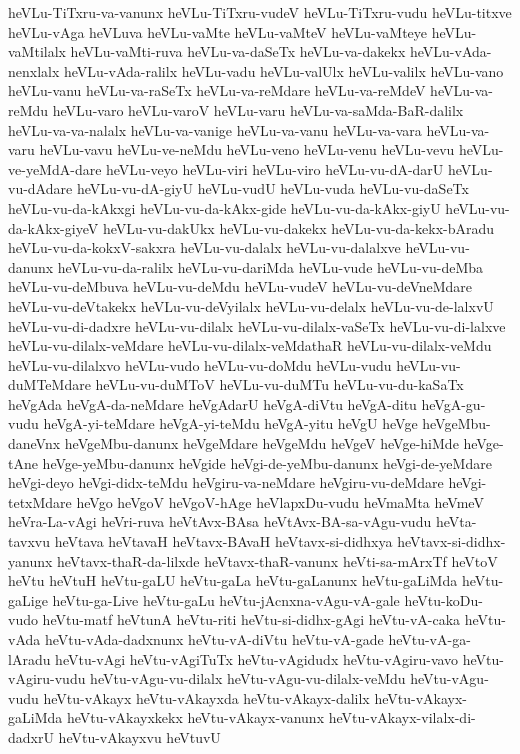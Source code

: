 {heVLu-TiTxru-va-vanunx
heVLu-TiTxru-vudeV
heVLu-TiTxru-vudu
heVLu-titxve
heVLu-vAga
heVLuva
heVLu-vaMte
heVLu-vaMteV
heVLu-vaMteye
heVLu-vaMtilalx
heVLu-vaMti-ruva
heVLu-va-daSeTx
heVLu-va-dakekx
heVLu-vAda-nenxlalx
heVLu-vAda-ralilx
heVLu-vadu
heVLu-valUlx
heVLu-valilx
heVLu-vano
heVLu-vanu
heVLu-va-raSeTx
heVLu-va-reMdare
heVLu-va-reMdeV
heVLu-va-reMdu
heVLu-varo
heVLu-varoV
heVLu-varu
heVLu-va-saMda-BaR-dalilx
heVLu-va-va-nalalx
heVLu-va-vanige
heVLu-va-vanu
heVLu-va-vara
heVLu-va-varu
heVLu-vavu
heVLu-ve-neMdu
heVLu-veno
heVLu-venu
heVLu-vevu
heVLu-ve-yeMdA-dare
heVLu-veyo
heVLu-viri
heVLu-viro
heVLu-vu-dA-darU
heVLu-vu-dAdare
heVLu-vu-dA-giyU
heVLu-vudU
heVLu-vuda
heVLu-vu-daSeTx
heVLu-vu-da-kAkxgi
heVLu-vu-da-kAkx-gide
heVLu-vu-da-kAkx-giyU
heVLu-vu-da-kAkx-giyeV
heVLu-vu-dakUkx
heVLu-vu-dakekx
heVLu-vu-da-kekx-bAradu
heVLu-vu-da-kokxV-sakxra
heVLu-vu-dalalx
heVLu-vu-dalalxve
heVLu-vu-danunx
heVLu-vu-da-ralilx
heVLu-vu-dariMda
heVLu-vude
heVLu-vu-deMba
heVLu-vu-deMbuva
heVLu-vu-deMdu
heVLu-vudeV
heVLu-vu-deVneMdare
heVLu-vu-deVtakekx
heVLu-vu-deVyilalx
heVLu-vu-delalx
heVLu-vu-de-lalxvU
heVLu-vu-di-dadxre
heVLu-vu-dilalx
heVLu-vu-dilalx-vaSeTx
heVLu-vu-di-lalxve
heVLu-vu-dilalx-veMdare
heVLu-vu-dilalx-veMdathaR
heVLu-vu-dilalx-veMdu
heVLu-vu-dilalxvo
heVLu-vudo
heVLu-vu-doMdu
heVLu-vudu
heVLu-vu-duMTeMdare
heVLu-vu-duMToV
heVLu-vu-duMTu
heVLu-vu-du-kaSaTx
heVgAda
heVgA-da-neMdare
heVgAdarU
heVgA-diVtu
heVgA-ditu
heVgA-gu-vudu
heVgA-yi-teMdare
heVgA-yi-teMdu
heVgA-yitu
heVgU
heVge
heVgeMbu-daneVnx
heVgeMbu-danunx
heVgeMdare
heVgeMdu
heVgeV
heVge-hiMde
heVge-tAne
heVge-yeMbu-danunx
heVgide
heVgi-de-yeMbu-danunx
heVgi-de-yeMdare
heVgi-deyo
heVgi-didx-teMdu
heVgiru-va-neMdare
heVgiru-vu-deMdare
heVgi-tetxMdare
heVgo
heVgoV
heVgoV-hAge
heVlapxDu-vudu
heVmaMta
heVmeV
heVra-La-vAgi
heVri-ruva
heVtAvx-BAsa
heVtAvx-BA-sa-vAgu-vudu
heVta-tavxvu
heVtava
heVtavaH
heVtavx-BAvaH
heVtavx-si-didhxya
heVtavx-si-didhx-yanunx
heVtavx-thaR-da-lilxde
heVtavx-thaR-vanunx
heVti-sa-mArxTf
heVtoV
heVtu
heVtuH
heVtu-gaLU
heVtu-gaLa
heVtu-gaLanunx
heVtu-gaLiMda
heVtu-gaLige
heVtu-ga-Live
heVtu-gaLu
heVtu-jAcnxna-vAgu-vA-gale
heVtu-koDu-vudo
heVtu-matf
heVtunA
heVtu-riti
heVtu-si-didhx-gAgi
heVtu-vA-caka
heVtu-vAda
heVtu-vAda-dadxnunx
heVtu-vA-diVtu
heVtu-vA-gade
heVtu-vA-ga-lAradu
heVtu-vAgi
heVtu-vAgiTuTx
heVtu-vAgidudx
heVtu-vAgiru-vavo
heVtu-vAgiru-vudu
heVtu-vAgu-vu-dilalx
heVtu-vAgu-vu-dilalx-veMdu
heVtu-vAgu-vudu
heVtu-vAkayx
heVtu-vAkayxda
heVtu-vAkayx-dalilx
heVtu-vAkayx-gaLiMda
heVtu-vAkayxkekx
heVtu-vAkayx-vanunx
heVtu-vAkayx-vilalx-di-dadxrU
heVtu-vAkayxvu
heVtuvU
}
